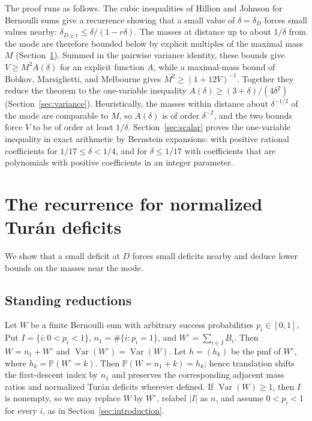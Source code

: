 \documentclass[ECP,preprint]{ejpecp}
\newcommand{\Pp}{\mathbb{P}}
\newcommand{\Var}{\operatorname{Var}}
\begin{document}
The proof runs as follows. The cubic inequalities of Hillion and Johnson for
Bernoulli sums give a recurrence showing that a small value of
$\delta=\delta_D$ forces small values nearby:
$\delta_{D\pm r}\leq\delta/(1-r\delta)$. The masses at distance up to about
$1/\delta$ from the mode are therefore bounded below by explicit multiples of
the maximal mass $M$ (Section~\ref{sec:propagation}). Summed in the pairwise
variance identity, these bounds give $V\geq M^2A(\delta)$ for an explicit
function $A$, while a maximal-mass bound of Bobkov, Marsiglietti, and
Melbourne gives $M^2\geq(1+12V)^{-1}$. Together they reduce the theorem to
the one-variable inequality $A(\delta)\geq(3+\delta)/(4\delta^2)$
(Section~\ref{sec:variance}). Heuristically, the masses within distance
about $\delta^{-1/2}$ of the mode are comparable to $M$, so $A(\delta)$ is
of order $\delta^{-2}$, and the two bounds force $V$ to be of order at least
$1/\delta$. Section~\ref{sec:scalar} proves the one-variable inequality in
exact arithmetic by Bernstein expansions: with positive rational coefficients
for $1/17\leq\delta<1/4$, and for $\delta\leq1/17$ with coefficients that are
polynomials with positive coefficients in an integer parameter.

\section{The recurrence for normalized Tur\'an deficits}
\label{sec:propagation}

We show that a small deficit at $D$ forces small deficits nearby and deduce
lower bounds on the masses near the mode.

\subsection{Standing reductions}\label{sec:reduction}

Let $W$ be a finite Bernoulli sum with arbitrary success probabilities
$p_i\in[0,1]$. Put
$I=\{i:0<p_i<1\}$,
$n_1=\#\{i:p_i=1\}$, and
$W^\circ=\sum_{i\in I}B_i$. Then $W=n_1+W^\circ$ and
$\Var(W^\circ)=\Var(W)$. Let $h=(h_k)$ be the pmf of $W^\circ$, where
$h_k=\Pp(W^\circ=k)$. Then $\Pp(W=n_1+k)=h_k$; hence translation shifts the
first-descent index by $n_1$ and
preserves the corresponding adjacent mass ratios and normalized Tur\'an
deficits wherever defined. If $\Var(W)\geq1$, then $I$ is nonempty, so we may
replace $W$ by $W^\circ$, relabel $|I|$ as $n$, and assume $0<p_i<1$ for every
$i$, as in Section~\ref{sec:introduction}.
\end{document}
